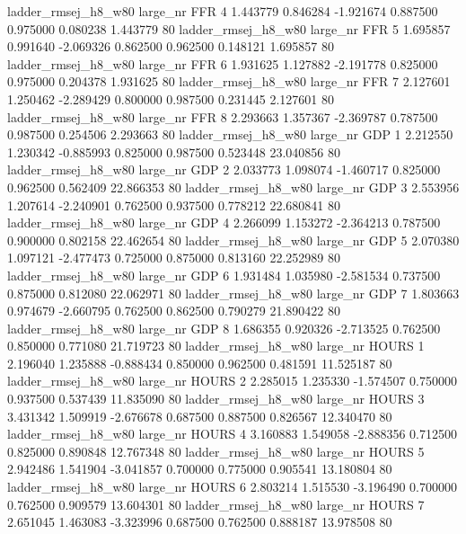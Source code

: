 ladder_rmsej_h8_w80   large_nr      FFR                 4  1.443779  0.846284  -1.921674 0.887500 0.975000  0.080238    1.443779 80
ladder_rmsej_h8_w80   large_nr      FFR                 5  1.695857  0.991640  -2.069326 0.862500 0.962500  0.148121    1.695857 80
ladder_rmsej_h8_w80   large_nr      FFR                 6  1.931625  1.127882  -2.191778 0.825000 0.975000  0.204378    1.931625 80
ladder_rmsej_h8_w80   large_nr      FFR                 7  2.127601  1.250462  -2.289429 0.800000 0.987500  0.231445    2.127601 80
ladder_rmsej_h8_w80   large_nr      FFR                 8  2.293663  1.357367  -2.369787 0.787500 0.987500  0.254506    2.293663 80
ladder_rmsej_h8_w80   large_nr      GDP                 1  2.212550  1.230342  -0.885993 0.825000 0.987500  0.523448   23.040856 80
ladder_rmsej_h8_w80   large_nr      GDP                 2  2.033773  1.098074  -1.460717 0.825000 0.962500  0.562409   22.866353 80
ladder_rmsej_h8_w80   large_nr      GDP                 3  2.553956  1.207614  -2.240901 0.762500 0.937500  0.778212   22.680841 80
ladder_rmsej_h8_w80   large_nr      GDP                 4  2.266099  1.153272  -2.364213 0.787500 0.900000  0.802158   22.462654 80
ladder_rmsej_h8_w80   large_nr      GDP                 5  2.070380  1.097121  -2.477473 0.725000 0.875000  0.813160   22.252989 80
ladder_rmsej_h8_w80   large_nr      GDP                 6  1.931484  1.035980  -2.581534 0.737500 0.875000  0.812080   22.062971 80
ladder_rmsej_h8_w80   large_nr      GDP                 7  1.803663  0.974679  -2.660795 0.762500 0.862500  0.790279   21.890422 80
ladder_rmsej_h8_w80   large_nr      GDP                 8  1.686355  0.920326  -2.713525 0.762500 0.850000  0.771080   21.719723 80
ladder_rmsej_h8_w80   large_nr    HOURS                 1  2.196040  1.235888  -0.888434 0.850000 0.962500  0.481591   11.525187 80
ladder_rmsej_h8_w80   large_nr    HOURS                 2  2.285015  1.235330  -1.574507 0.750000 0.937500  0.537439   11.835090 80
ladder_rmsej_h8_w80   large_nr    HOURS                 3  3.431342  1.509919  -2.676678 0.687500 0.887500  0.826567   12.340470 80
ladder_rmsej_h8_w80   large_nr    HOURS                 4  3.160883  1.549058  -2.888356 0.712500 0.825000  0.890848   12.767348 80
ladder_rmsej_h8_w80   large_nr    HOURS                 5  2.942486  1.541904  -3.041857 0.700000 0.775000  0.905541   13.180804 80
ladder_rmsej_h8_w80   large_nr    HOURS                 6  2.803214  1.515530  -3.196490 0.700000 0.762500  0.909579   13.604301 80
ladder_rmsej_h8_w80   large_nr    HOURS                 7  2.651045  1.463083  -3.323996 0.687500 0.762500  0.888187   13.978508 80
